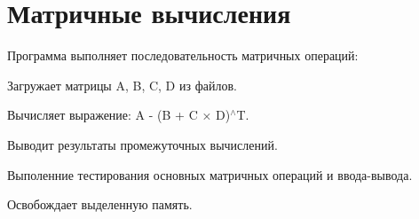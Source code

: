 \chapter{Матричные вычисления}
\hypertarget{index}{}\label{index}
Программа выполняет последовательность матричных операций\+:
\begin{DoxyEnumerate}
\item Загружает матрицы A, B, C, D из файлов.
\item Вычисляет выражение\+: A -\/ (B + C × D)\texorpdfstring{$^\wedge$}{\string^}T.
\item Выводит результаты промежуточных вычислений.
\item Выполенние тестирования основных матричных операций и ввода-\/вывода.
\item Освобождает выделенную память. 
\end{DoxyEnumerate}